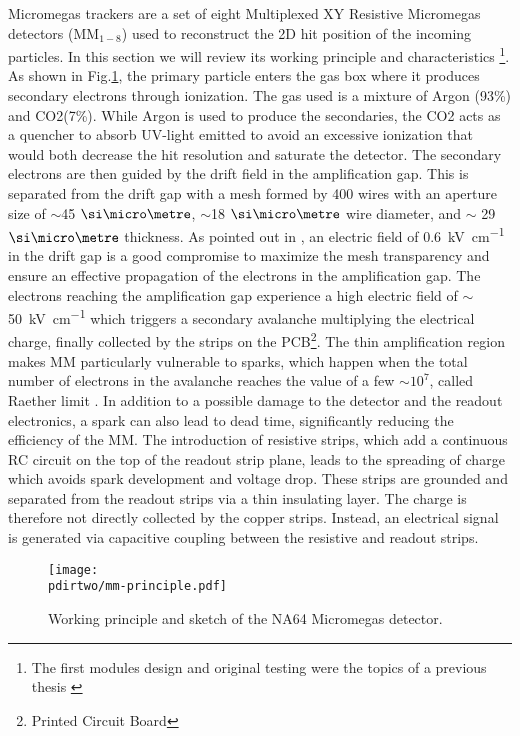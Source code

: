 Micromegas trackers are a set of eight Multiplexed XY Resistive Micromegas detectors (MM$_{1-8}$) used to reconstruct the 2D hit position of the incoming particles. In this section we will review its working principle and characteristics \footnote{The first modules design and original testing were the topics of a previous thesis \cite{dbanerjee-thesis}}.
As shown in Fig.\ref{fig:mm-sketch}, the primary particle enters the gas box where it produces secondary electrons through ionization. The gas used is a mixture of Argon (93\%) and CO2(7\%). While Argon is used to produce the secondaries, the CO2 acts as a quencher to absorb UV-light emitted to avoid an excessive ionization that would both decrease the hit resolution and saturate the detector. The secondary electrons are then guided by the drift field in the amplification gap. This is separated from the drift gap with a mesh formed by 400 wires with an aperture size of $\sim$45 $\mum$, $\sim$18 $\mum$ wire diameter, and $\sim$ 29 $\mum$ thickness. As pointed out in \cite{Bortfeldt:2014vvt}, an electric field of \SI{0.6}{\kilo\volt\per\centi\metre} in the drift gap is a good compromise to maximize the mesh transparency and ensure an effective propagation of the electrons in the amplification gap. The electrons reaching the amplification gap experience a high electric field of $\sim$\SI{50}{\kilo\volt\per\centi\metre} which triggers a secondary avalanche multiplying the electrical charge, finally collected by the strips on the PCB\footnote{Printed Circuit Board}.
The thin amplification region makes MM particularly vulnerable to sparks, which happen when the total number of electrons in the avalanche reaches the value of a few $\sim 10^7$, called Raether limit \cite{BAY2002162,BRESSAN1999321,Raether:102989}. In addition to a possible damage to the detector and the readout electronics, a spark can also lead to dead time, significantly reducing the efficiency of the MM. The introduction of resistive strips, which add a continuous RC circuit on the top of the readout strip plane, leads to the spreading of charge which avoids spark development and voltage drop. These strips are grounded and separated from the readout strips via a thin insulating layer. The charge is therefore not directly collected by the copper strips. Instead, an electrical signal is generated via capacitive coupling between the resistive and readout strips.

\begin{figure}[bth!]
  \centering
  \texttt{[image: \\pdirtwo/mm-principle.pdf]}
\caption[Micromegas sketch]{Working principle and sketch of the NA64 Micromegas detector.}
\label{fig:mm-sketch}
\end{figure}

